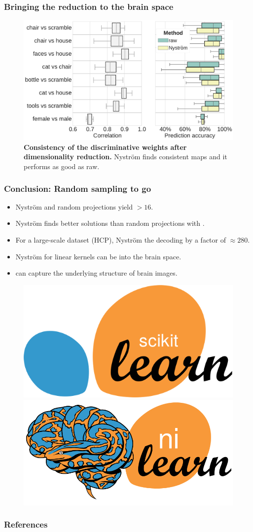 \documentclass{beamer}
\begin{document}
\begin{frame}\frametitle{\textbf{Bringing the reduction to the brain space}}
\begin{figure}
\centering
\includegraphics[width=1\linewidth]{figures/correlation.pdf}
\caption{\textbf{Consistency of the discriminative weights after dimensionality 
reduction.} Nystr\"om finds consistent maps and it performs as good as raw.}
\end{figure}
\end{frame}


\begin{frame}\frametitle{\textbf{Conclusion:} Random sampling to go}
\begin{block}{}
\begin{itemize}
\item Nystr\"om and random projections yield  $> 16$.
\item Nystr\"om finds better solutions than random projections with 
.
\item For a large-scale dataset (HCP), Nystr\"om  
the 
decoding by a factor of $\approx 280$.
\item Nystr\"om for linear kernels can be  
into the brain space.
\item {} can capture the underlying 
structure of brain images.
\end{itemize}
\end{block}

\begin{figure}
\includegraphics[width=0.3\linewidth]{figures/scikit-learn-logo.png}\hfill
\includegraphics[width=0.3\linewidth]{figures/nilearn-logo.png}
\end{figure}

\end{frame}

\begin{frame}\frametitle{References}


\end{frame}
\end{document}
